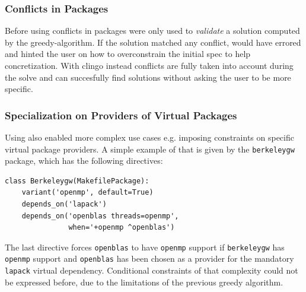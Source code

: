 \subsubsection{Conflicts in Packages}
Before using \clingo{} conflicts in packages were only used to \emph{validate} a solution computed by the greedy-algorithm. If the solution matched any conflict, \spack{} would have errored and hinted the user on how to overconstrain the initial spec to help concretization. With clingo instead conflicts are fully taken into account during the solve\footnotemark{} and \spack{} can succesfully find solutions without asking the user to be more specific.

\subsubsection{Specialization on Providers of Virtual Packages}
Using \clingo{} also enabled more complex use cases e.g. imposing constraints on specific virtual package providers. A simple example of that is given by the \texttt{berkeleygw} package, which has the following directives:

\begin{verbatim}
class Berkeleygw(MakefilePackage):
    variant('openmp', default=True)
    depends_on('lapack')
    depends_on('openblas threads=openmp',
               when='+openmp ^openblas')
\end{verbatim}

The last directive forces \texttt{openblas} to have \texttt{openmp} support if \texttt{berkeleygw} has \texttt{openmp} support and \texttt{openblas} has been chosen as a provider for the mandatory \texttt{lapack} virtual dependency. Conditional constraints of that complexity could not be expressed before, due to the limitations of the previous greedy algorithm.
